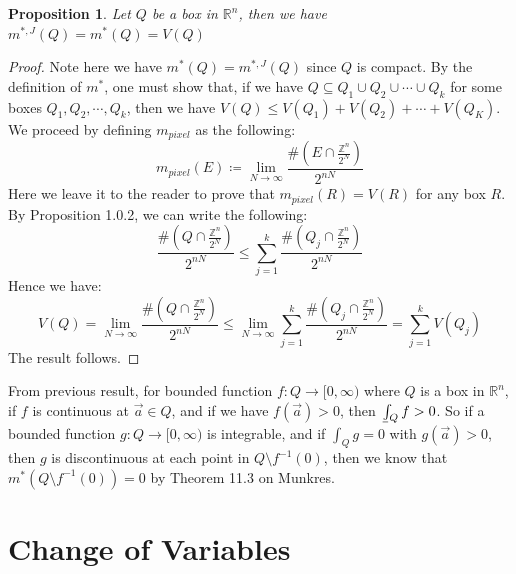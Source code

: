 \documentclass[11pt,oneside]{book}
\theoremstyle{break}
\theoremstyle{break}
\newtheorem{prop}[lem]{Proposition}
\def\lowint{\mkern3mu\underline{\vphantom{\intop}\mkern7mu}\mkern-10mu\int}
\newcommand{\R}{\mathbb{R}}
\newcommand{\Z}{\mathbb{Z}}
\begin{document}
\begin{prop}
Let $Q$ be a box in $\R^n$, then we have $ m^{*,J}(Q) = m^*(Q) = V(Q)$
\end{prop}
\begin{proof}
Note here we have $m^*\left(Q\right) = m^{*,J}\left(Q\right)$ since $Q$ is compact. By the definition of $m^*$, one must show that, if we have $Q \subseteq Q_1\cup Q_2\cup \cdots\cup Q_k$ for some boxes $Q_1,Q_2,\cdots,Q_k$, then we have $V\left(Q\right) \leq V\left(Q_1\right) + V\left(Q_2\right) +\cdots +V\left(Q_K\right)$.  We proceed by defining $m_{pixel}$ as the following: $$m_{pixel}\left(E\right) \coloneqq \lim_{N \to \infty} \frac{\#\left(E\cap \frac{\Z^n}{2^N}\right)}{2^{nN}}$$
Here we leave it to the reader to prove that $m_{pixel}\left(R\right) = V\left(R\right)$ for any box $R$. By Proposition 1.0.2, we can write the following:
$$\frac{\#\left(Q\cap \frac{\Z^n}{2^N}\right)}{2^{nN}} \leq \sum_{j=1}^k\frac{\#\left(Q_j\cap \frac{\Z^n}{2^N}\right)}{2^{nN}}$$ Hence we have:
$$V\left(Q\right) = \lim_{N \to \infty} \frac{\#\left(Q\cap \frac{\Z^n}{2^N}\right)}{2^{nN}} \leq \lim_{N \to \infty} \sum_{j=1}^k\frac{\#\left(Q_j\cap \frac{\Z^n}{2^N}\right)}{2^{nN}} = \sum_{j=1}^k V\left(Q_j\right)
$$The result follows.
\end{proof}

From previous result, for bounded function $f:Q \to [0,\infty)$ where $Q$ is a box in $\R^n$, if $f$ is continuous at $\vec{a}\in Q$, and if we have $f(\vec{a})>0$, then $\lowint_Q f >0$. So if a bounded function $g:Q \to [0,\infty)$ is integrable, and if $\int_Q g = 0$ with $g(\vec{a}) >0$, then $g$ is discontinuous at each point in $Q\setminus f^{-1}(0)$, then we know that $m^*(Q\setminus f^{-1}(0)) = 0$ by Theorem 11.3 on Munkres.

\newpage
\section[Change of Variables]{\color{red} Change of Variables \color{black}}
\end{document}
